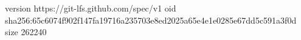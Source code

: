 version https://git-lfs.github.com/spec/v1
oid sha256:65c6074f902f147fa19716a235703e8ed2025a65e4e1e0285e67dd5c591a3f0d
size 262240
